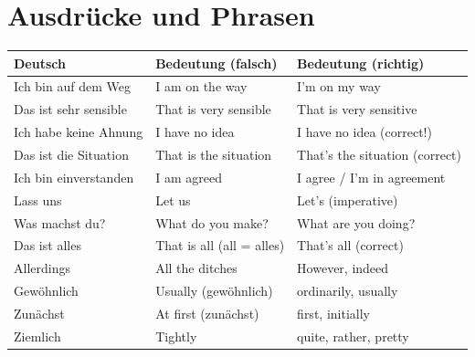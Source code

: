 \section{Ausdrücke und Phrasen}
\label{sec:FFAusdruecke}

\bigskip
\begin{center}
\begin{tabular}{|l|p{6cm}|p{6cm}|}
\hline
Deutsch & Bedeutung (falsch) & Bedeutung (richtig) \\ \hline
Ich bin auf dem Weg & I am on the way & I'm on my way \\ \hline
Das ist sehr sensible & That is very sensible & That is very sensitive \\ \hline
Ich habe keine Ahnung & I have no idea & I have no idea (correct!) \\ \hline
Das ist die Situation & That is the situation & That's the situation (correct) \\ \hline
Ich bin einverstanden & I am agreed & I agree / I'm in agreement \\ \hline
Lass uns & Let us & Let's (imperative) \\ \hline
Was machst du? & What do you make? & What are you doing? \\ \hline
Das ist alles & That is all (all = alles) & That's all (correct) \\ \hline
Allerdings & All the ditches & However, indeed \\ \hline
Gewöhnlich & Usually (gewöhnlich) & ordinarily, usually \\ \hline
Zunächst & At first (zunächst) & first, initially \\ \hline
Ziemlich & Tightly & quite, rather, pretty \\ \hline
\end{tabular}
\end{center}

\chapterend